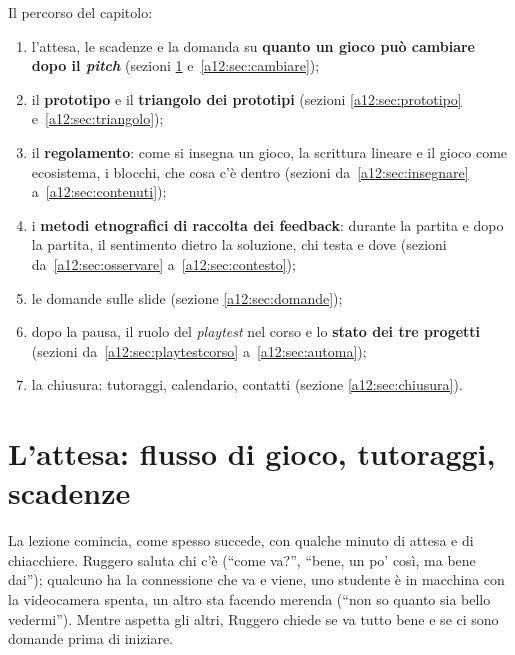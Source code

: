 Il percorso del capitolo:
\begin{enumerate}
  \item l'attesa, le scadenze e la domanda su \textbf{quanto un gioco può cambiare dopo
        il \emph{pitch}} (sezioni \ref{a12:sec:attesa} e~\ref{a12:sec:cambiare});
  \item il \textbf{prototipo} e il \textbf{triangolo dei prototipi} (sezioni
        \ref{a12:sec:prototipo} e~\ref{a12:sec:triangolo});
  \item il \textbf{regolamento}: come si insegna un gioco, la scrittura lineare e il
        gioco come ecosistema, i blocchi, che cosa c'è dentro (sezioni
        da~\ref{a12:sec:insegnare} a~\ref{a12:sec:contenuti});
  \item i \textbf{metodi etnografici di raccolta dei feedback}: durante la partita e
        dopo la partita, il sentimento dietro la soluzione, chi testa e dove (sezioni
        da~\ref{a12:sec:osservare} a~\ref{a12:sec:contesto});
  \item le domande sulle slide (sezione \ref{a12:sec:domande});
  \item dopo la pausa, il ruolo del \emph{playtest} nel corso e lo \textbf{stato dei tre
        progetti} (sezioni da~\ref{a12:sec:playtestcorso} a~\ref{a12:sec:automa});
  \item la chiusura: tutoraggi, calendario, contatti (sezione \ref{a12:sec:chiusura}).
\end{enumerate}

\section{L'attesa: flusso di gioco, tutoraggi, scadenze}
\label{a12:sec:attesa}

La lezione comincia, come spesso succede, con qualche minuto di attesa e di chiacchiere.
Ruggero saluta chi c'è (``come va?'', ``bene, un po' così, ma bene dai''); qualcuno ha
la connessione che va e viene, uno studente è in macchina con la videocamera spenta, un
altro sta facendo merenda (``non so quanto sia bello vedermi''). Mentre aspetta gli
altri, Ruggero chiede se va tutto bene e se ci sono domande prima di iniziare.

